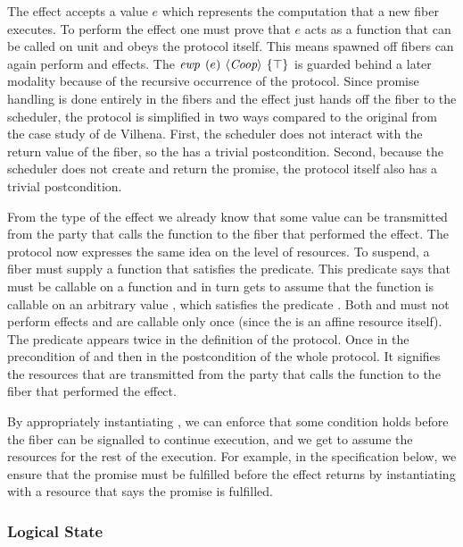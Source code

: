 The \efork{} effect accepts a value \(e\) which represents the computation that a new fiber executes.
To perform the effect one must prove that \(e\) acts as a function that can be called on unit and obeys the \proto{} protocol itself.
This means spawned off fibers can again perform \efork{} and \esuspend{} effects.
The \(\ewp{e}{\proto{}}{\top}\) is guarded behind a later modality because of the recursive occurrence of the \proto{} protocol.
Since promise handling is done entirely in the fibers and the \efork{} effect just hands off the fiber to the scheduler, the protocol is simplified in two ways compared to the original from the case study of de Vilhena.
First, the scheduler does not interact with the return value of the fiber, so the \ewpt{} has a trivial postcondition.
Second, because the scheduler does not create and return the promise, the protocol itself also has a trivial postcondition.

From the type of the \esuspend{} effect we already know that some value can be transmitted from the party that calls the  function to the fiber that performed the effect.
The \esuspend{} protocol now expresses the same idea on the level of resources.
To suspend, a fiber must supply a function  that satisfies the \gsIsReg{} predicate.
This predicate says that  must be callable on a  function and in turn gets to assume that the  function is callable on an arbitrary value , which satisfies the predicate .
Both  and  must not perform effects and are callable only once (since the \ewpt{} is an affine resource itself).
The predicate  appears twice in the definition of the protocol.
Once in the precondition of  and then in the postcondition of the whole protocol.
It signifies the resources that are transmitted from the party that calls the  function to the fiber that performed the effect.

By appropriately instantiating , we can enforce that some condition holds before the fiber can be signalled to continue execution, and we get to assume the resources  for the rest of the execution.
For example, in the  specification below, we ensure that the promise must be fulfilled before the effect returns by instantiating  with a resource that says the promise is fulfilled.

\subsubsection{Logical State}
\label{sec:sched-spec-state}

